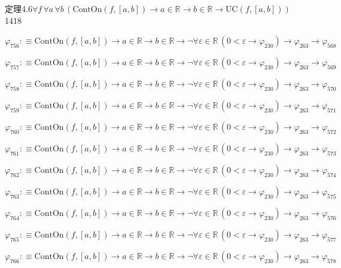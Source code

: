 \begin{fullproof}{定理4.6}{$\forall f\,\forall a\,\forall b\,(\mathrm{ContOn}(f,[a,b]) \to a \in \mathbb{R} \to b \in \mathbb{R} \to \mathrm{UC}(f,[a,b]))$}{1418}
\begin{abbrevlist}
\item $\varphi_{756} :\equiv \mathrm{ContOn}(f,[a,b]) \to a \in \mathbb{R} \to b \in \mathbb{R} \to \neg \forall \varepsilon \in \mathbb{R}\,(0 < \varepsilon \to \varphi_{230}) \to \varphi_{263} \to \varphi_{568}$
\item $\varphi_{757} :\equiv \mathrm{ContOn}(f,[a,b]) \to a \in \mathbb{R} \to b \in \mathbb{R} \to \neg \forall \varepsilon \in \mathbb{R}\,(0 < \varepsilon \to \varphi_{230}) \to \varphi_{263} \to \varphi_{569}$
\item $\varphi_{758} :\equiv \mathrm{ContOn}(f,[a,b]) \to a \in \mathbb{R} \to b \in \mathbb{R} \to \neg \forall \varepsilon \in \mathbb{R}\,(0 < \varepsilon \to \varphi_{230}) \to \varphi_{263} \to \varphi_{570}$
\item $\varphi_{759} :\equiv \mathrm{ContOn}(f,[a,b]) \to a \in \mathbb{R} \to b \in \mathbb{R} \to \neg \forall \varepsilon \in \mathbb{R}\,(0 < \varepsilon \to \varphi_{230}) \to \varphi_{263} \to \varphi_{571}$
\item $\varphi_{760} :\equiv \mathrm{ContOn}(f,[a,b]) \to a \in \mathbb{R} \to b \in \mathbb{R} \to \neg \forall \varepsilon \in \mathbb{R}\,(0 < \varepsilon \to \varphi_{230}) \to \varphi_{263} \to \varphi_{572}$
\item $\varphi_{761} :\equiv \mathrm{ContOn}(f,[a,b]) \to a \in \mathbb{R} \to b \in \mathbb{R} \to \neg \forall \varepsilon \in \mathbb{R}\,(0 < \varepsilon \to \varphi_{230}) \to \varphi_{263} \to \varphi_{573}$
\item $\varphi_{762} :\equiv \mathrm{ContOn}(f,[a,b]) \to a \in \mathbb{R} \to b \in \mathbb{R} \to \neg \forall \varepsilon \in \mathbb{R}\,(0 < \varepsilon \to \varphi_{230}) \to \varphi_{263} \to \varphi_{574}$
\item $\varphi_{763} :\equiv \mathrm{ContOn}(f,[a,b]) \to a \in \mathbb{R} \to b \in \mathbb{R} \to \neg \forall \varepsilon \in \mathbb{R}\,(0 < \varepsilon \to \varphi_{230}) \to \varphi_{263} \to \varphi_{575}$
\item $\varphi_{764} :\equiv \mathrm{ContOn}(f,[a,b]) \to a \in \mathbb{R} \to b \in \mathbb{R} \to \neg \forall \varepsilon \in \mathbb{R}\,(0 < \varepsilon \to \varphi_{230}) \to \varphi_{263} \to \varphi_{576}$
\item $\varphi_{765} :\equiv \mathrm{ContOn}(f,[a,b]) \to a \in \mathbb{R} \to b \in \mathbb{R} \to \neg \forall \varepsilon \in \mathbb{R}\,(0 < \varepsilon \to \varphi_{230}) \to \varphi_{263} \to \varphi_{577}$
\item $\varphi_{766} :\equiv \mathrm{ContOn}(f,[a,b]) \to a \in \mathbb{R} \to b \in \mathbb{R} \to \neg \forall \varepsilon \in \mathbb{R}\,(0 < \varepsilon \to \varphi_{230}) \to \varphi_{263} \to \varphi_{578}$

\end{abbrevlist}
\end{fullproof}
